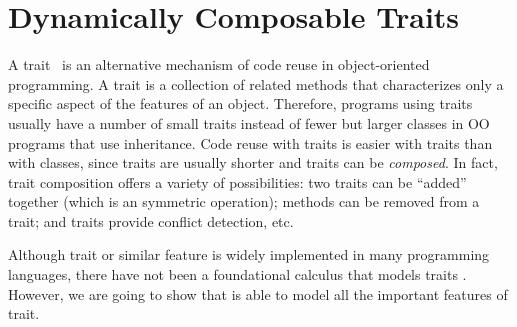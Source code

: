 \begin{comment}
\paragraph{Conservatively rejecting intersections.}
To avoid incoherence, and the issues of biased choice, another option
is simply to reject programs where the
instantiations of type variables may lead to incoherent programs.
In this case the definition of \lstinline$fst$ would be rejected, since there
are indeed some cases that may lead to incoherent programs.
Unfortunately this is too restrictive and prevents many useful
programs.

We have built a source language that is desugared into \name. The most
central feature is the trait declaration. Trait can take several parameters,
which is then in scope in the body of the trait definition. In fact, trait
creation is dynamic, which means it can be contained inside a function.
\end{comment}

\section{Dynamically Composable Traits}

A trait~\cite{scharli2003traits} is an alternative
mechanism of code reuse in object-oriented programming. 
A trait is a
collection of related methods that characterizes only a specific
aspect of the features of an object.  Therefore, programs using traits
usually have a number of small traits instead of fewer but larger
classes in OO programs that use inheritance. Code reuse with traits is
easier with traits than with classes, since traits are usually shorter
and traits can be \emph{composed}. In fact, trait composition offers a
variety of possibilities: two traits can be ``added'' together (which
is an symmetric operation); methods can be removed from a trait; and
traits provide conflict detection, etc.

Although trait or similar feature is widely implemented in many programming
languages, there have not been a foundational calculus that models traits
.
However, we are going to show that \name is able to model all the important
features of trait.

